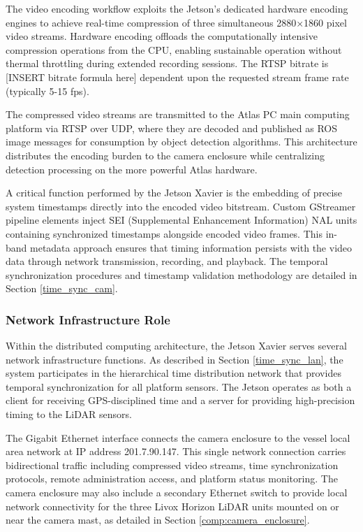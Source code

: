 \documentclass{erauthesis}
\begin{document}
The video encoding workflow exploits the Jetson's dedicated hardware encoding engines to achieve real-time compression of three simultaneous 2880×1860 pixel video streams. Hardware encoding offloads the computationally intensive compression operations from the CPU, enabling sustainable operation without thermal throttling during extended recording sessions. The RTSP bitrate is [INSERT bitrate formula here] dependent upon the requested stream frame rate (typically 5-15 fps).

The compressed video streams are transmitted to the Atlas PC main computing platform via RTSP over UDP, where they are decoded and published as ROS image messages for consumption by object detection algorithms. This architecture distributes the encoding burden to the camera enclosure while centralizing detection processing on the more powerful Atlas hardware.

A critical function performed by the Jetson Xavier is the embedding of precise system timestamps directly into the encoded video bitstream. Custom GStreamer pipeline elements inject SEI (Supplemental Enhancement Information) NAL units containing synchronized timestamps alongside encoded video frames. This in-band metadata approach ensures that timing information persists with the video data through network transmission, recording, and playback. The temporal synchronization procedures and timestamp validation methodology are detailed in Section \ref{time_sync_cam}.

\subsubsection{Network Infrastructure Role}

Within the distributed computing architecture, the Jetson Xavier serves several network infrastructure functions. As described in Section \ref{time_sync_lan}, the system participates in the hierarchical time distribution network that provides temporal synchronization for all platform sensors. The Jetson operates as both a client for receiving GPS-disciplined time and a server for providing high-precision timing to the LiDAR sensors.

The Gigabit Ethernet interface connects the camera enclosure to the vessel local area network at IP address 201.7.90.147. This single network connection carries bidirectional traffic including compressed video streams, time synchronization protocols, remote administration access, and platform status monitoring. The camera enclosure may also include a secondary Ethernet switch to provide local network connectivity for the three Livox Horizon LiDAR units mounted on or near the camera mast, as detailed in Section \ref{comp:camera_enclosure}.
\end{document}
